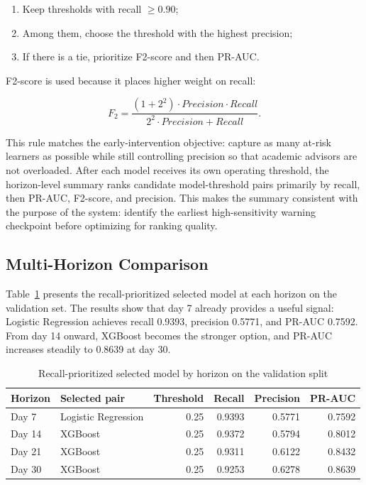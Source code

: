 \documentclass[conference]{IEEEtran}
\begin{document}
\begin{enumerate}
    \item Keep thresholds with recall \(\geq 0.90\);
    \item Among them, choose the threshold with the highest precision;
    \item If there is a tie, prioritize F2-score and then PR-AUC.
\end{enumerate}

F2-score is used because it places higher weight on recall:

\begin{equation}
F_{2} = \frac{(1+2^2) \cdot Precision \cdot Recall}{2^2 \cdot Precision + Recall}.
\end{equation}

This rule matches the early-intervention objective: capture as many at-risk learners as possible while still controlling precision so that academic advisors are not overloaded. After each model receives its own operating threshold, the horizon-level summary ranks candidate model-threshold pairs primarily by recall, then PR-AUC, F2-score, and precision. This makes the summary consistent with the purpose of the system: identify the earliest high-sensitivity warning checkpoint before optimizing for ranking quality.

\subsection{Multi-Horizon Comparison}

Table~\ref{tab:horizon-best} presents the recall-prioritized selected model at each horizon on the validation set. The results show that day 7 already provides a useful signal: Logistic Regression achieves recall 0.9393, precision 0.5771, and PR-AUC 0.7592. From day 14 onward, XGBoost becomes the stronger option, and PR-AUC increases steadily to 0.8639 at day 30.

\begin{table}[t]
\centering
\footnotesize
\caption{Recall-prioritized selected model by horizon on the validation split}
\label{tab:horizon-best}
\begin{tabular}{l l r r r r}
\toprule
Horizon & Selected pair & Threshold & Recall & Precision & PR-AUC \\
\midrule
Day 7 & Logistic Regression & 0.25 & 0.9393 & 0.5771 & 0.7592 \\
Day 14 & XGBoost & 0.25 & 0.9372 & 0.5794 & 0.8012 \\
Day 21 & XGBoost & 0.25 & 0.9311 & 0.6122 & 0.8432 \\
Day 30 & XGBoost & 0.25 & 0.9253 & 0.6278 & 0.8639 \\
\bottomrule
\end{tabular}
\end{table}
\end{document}
